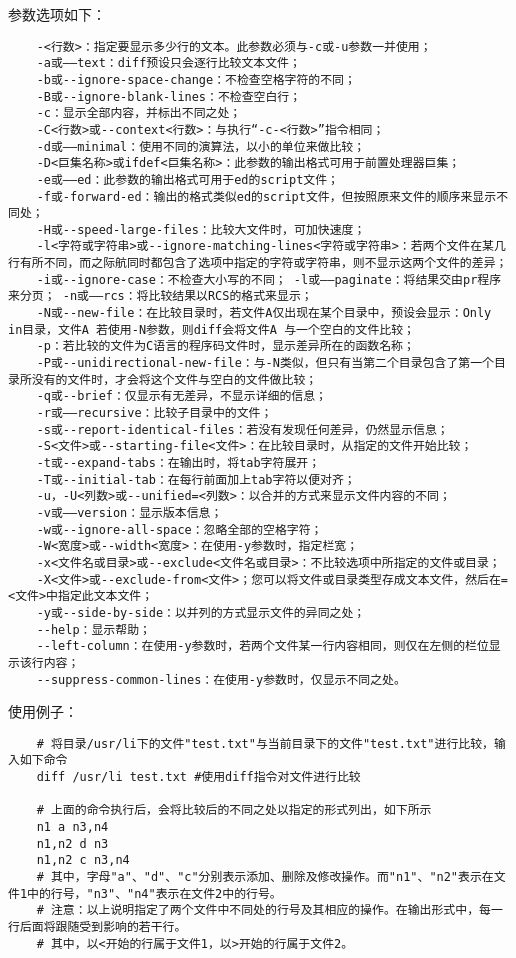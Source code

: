 \documentclass[a4paper,left=2.5cm,right=2.5cm,11pt]{article}
\begin{document}
	参数选项如下：
	\begin{lstlisting}
	-<行数>：指定要显示多少行的文本。此参数必须与-c或-u参数一并使用； 
	-a或——text：diff预设只会逐行比较文本文件； 
	-b或--ignore-space-change：不检查空格字符的不同； 
	-B或--ignore-blank-lines：不检查空白行； 
	-c：显示全部内容，并标出不同之处； 
	-C<行数>或--context<行数>：与执行“-c-<行数>”指令相同； 
	-d或——minimal：使用不同的演算法，以小的单位来做比较； 
	-D<巨集名称>或ifdef<巨集名称>：此参数的输出格式可用于前置处理器巨集； 
	-e或——ed：此参数的输出格式可用于ed的script文件； 
	-f或-forward-ed：输出的格式类似ed的script文件，但按照原来文件的顺序来显示不同处； 
	-H或--speed-large-files：比较大文件时，可加快速度； 
	-l<字符或字符串>或--ignore-matching-lines<字符或字符串>：若两个文件在某几行有所不同，而之际航同时都包含了选项中指定的字符或字符串，则不显示这两个文件的差异； 
	-i或--ignore-case：不检查大小写的不同； -l或——paginate：将结果交由pr程序来分页； -n或——rcs：将比较结果以RCS的格式来显示； 
	-N或--new-file：在比较目录时，若文件A仅出现在某个目录中，预设会显示：Only in目录，文件A 若使用-N参数，则diff会将文件A 与一个空白的文件比较； 
	-p：若比较的文件为C语言的程序码文件时，显示差异所在的函数名称； 
	-P或--unidirectional-new-file：与-N类似，但只有当第二个目录包含了第一个目录所没有的文件时，才会将这个文件与空白的文件做比较； 
	-q或--brief：仅显示有无差异，不显示详细的信息； 
	-r或——recursive：比较子目录中的文件； 
	-s或--report-identical-files：若没有发现任何差异，仍然显示信息； 
	-S<文件>或--starting-file<文件>：在比较目录时，从指定的文件开始比较； 
	-t或--expand-tabs：在输出时，将tab字符展开； 
	-T或--initial-tab：在每行前面加上tab字符以便对齐； 
	-u，-U<列数>或--unified=<列数>：以合并的方式来显示文件内容的不同； 
	-v或——version：显示版本信息； 
	-w或--ignore-all-space：忽略全部的空格字符； 
	-W<宽度>或--width<宽度>：在使用-y参数时，指定栏宽； 
	-x<文件名或目录>或--exclude<文件名或目录>：不比较选项中所指定的文件或目录； 
	-X<文件>或--exclude-from<文件>；您可以将文件或目录类型存成文本文件，然后在=<文件>中指定此文本文件； 
	-y或--side-by-side：以并列的方式显示文件的异同之处； 
	--help：显示帮助； 
	--left-column：在使用-y参数时，若两个文件某一行内容相同，则仅在左侧的栏位显示该行内容； 
	--suppress-common-lines：在使用-y参数时，仅显示不同之处。
	\end{lstlisting}

	使用例子：
	\begin{lstlisting}
	# 将目录/usr/li下的文件"test.txt"与当前目录下的文件"test.txt"进行比较，输入如下命令
	diff /usr/li test.txt #使用diff指令对文件进行比较

	# 上面的命令执行后，会将比较后的不同之处以指定的形式列出，如下所示
	n1 a n3,n4 
	n1,n2 d n3 
	n1,n2 c n3,n4 
	# 其中，字母"a"、"d"、"c"分别表示添加、删除及修改操作。而"n1"、"n2"表示在文件1中的行号，"n3"、"n4"表示在文件2中的行号。
	# 注意：以上说明指定了两个文件中不同处的行号及其相应的操作。在输出形式中，每一行后面将跟随受到影响的若干行。
	# 其中，以<开始的行属于文件1，以>开始的行属于文件2。
	\end{lstlisting}
\end{document}
